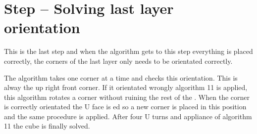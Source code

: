 \section{Step -- Solving last layer orientation}
This is the last step and when the algorithm gets to this step everything is placed correctly, the corners of the last layer only needs to be orientated correctly.

The algorithm takes one corner at a time and checks this orientation. This is alway the up right front corner. If it orientated wrongly algorithm 11 is applied, this algorithm rotates a corner without ruining the rest of the \cube{}. When the corner is correctly orientated the U face is \twist{}ed so a new corner is placed in this position and the same procedure is applied. After four U turns and appliance of algorithm 11 the cube is finally solved. 



\begin{comment}
In the last layer the corners in the last layer were poisitend correctly but not oreiented. In this step will the coreners be oreinted correctly and as result it will lead to that the \rubiks{} will be solved.

This step is very simple because it there is only four corners to control and either the corner is oriented correctly or is isn't.  

The program vil first control that the front-right-up corner is oriented correctly if not the will use the an algorithm twice and after the program vil control the corner again if the corner is not oriented correctly his time the use teh algorithme and will continue with this until the corner is oriented correctly. 
Then the corner is orented correctly the program will make at up move ("U") and will control the new corner and the program will do this with every corner in the last layer until they are oriented corectly.  

\end{comment}
